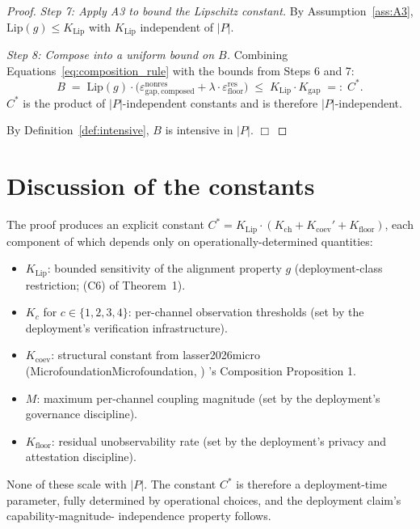 \documentclass{article}
\makeatletter
\newcommand{\citep}[2][]{%
  \begingroup
  \def\@tmpkey{#2}%
  \ifx\@tmpkey\@empty\else
    (\ifx\@empty#1\@empty\else #1, \fi
     \@nameuse{bibkey@\@tmpkey})%
  \fi
  \endgroup
}
\newcommand{\epsfloor}{\varepsilon_{\mathrm{floor}}^{\mathrm{res}}}
\newcommand{\epsnonresComposed}{\varepsilon_{\mathrm{gap},\mathrm{composed}}^{\mathrm{nonres}}}
\makeatother
\begin{document}
\begin{proof}
\emph{Step 7: Apply A3 to bound the Lipschitz constant.}
By Assumption~\ref{ass:A3}, $\mathrm{Lip}(g) \leq K_{\mathrm{Lip}}$
with $K_{\mathrm{Lip}}$ independent of $|P|$.

\emph{Step 8: Compose into a uniform bound on $B$.}
Combining Equations~\ref{eq:composition_rule} with the bounds from
Steps 6 and 7:
\begin{equation}
\label{eq:final_bound}
  B \;=\; \mathrm{Lip}(g) \cdot \bigl(\epsnonresComposed + \lambda
  \cdot \epsfloor\bigr)
  \;\leq\; K_{\mathrm{Lip}} \cdot K_{\mathrm{gap}}
  \;=:\; C^*.
\end{equation}
$C^*$ is the product of $|P|$-independent constants and is therefore
$|P|$-independent.

By Definition~\ref{def:intensive}, $B$ is intensive in $|P|$. $\Box$
\end{proof}

\section{Discussion of the constants}

The proof produces an explicit constant $C^* = K_{\mathrm{Lip}}
\cdot (K_{\mathrm{ch}} + K_{\mathrm{coev}}' + K_{\mathrm{floor}})$,
each component of which depends only on operationally-determined
quantities:

\begin{itemize}
\item $K_{\mathrm{Lip}}$: bounded sensitivity of the alignment
  property $g$ (deployment-class restriction; (C6) of Theorem~1).
\item $K_c$ for $c \in \{1,2,3,4\}$: per-channel observation
  thresholds (set by the deployment's verification infrastructure).
\item $K_{\mathrm{coev}}$: structural constant from
  \citep[Microfoundation]{lasser2026micro}'s Composition Proposition 1.
\item $M$: maximum per-channel coupling magnitude (set by the
  deployment's governance discipline).
\item $K_{\mathrm{floor}}$: residual unobservability rate (set by
  the deployment's privacy and attestation discipline).
\end{itemize}

None of these scale with $|P|$. The constant $C^*$ is therefore a
deployment-time parameter, fully determined by operational
choices, and the deployment claim's capability-magnitude-
independence property follows.
\end{document}
